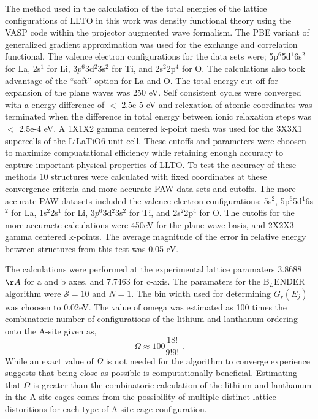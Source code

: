 \documentclass[aps,pre,reprint,superscriptaddress,showkeys]{revtex4-1}
\begin{document}
The method used in the calculation of the total energies of the lattice configurations of LLTO in this work was density functional theory using the VASP code\cite{Vasp1,Vasp2,Vasp3,Vasp4} within the projector augmented wave formalism\cite{Blochl}. The PBE variant of generalized gradient approximation was used for the exchange and correlation functional\cite{PBE}. The valence electron configurations for the data sets were; 5p$^{6}$5d$^{1}$6s$^{2}$ for La, 2s$^{1}$ for Li, 3$p^{6}$3d$^{2}$3s$^{2}$ for Ti, and 2s$^{2}$2p$^{4}$ for O. The calculations also took advantage of the ``soft'' option for La and O.   The total energy cut off for expansion of the plane waves was 250 eV.  Self consistent cycles were converged with a energy difference of $<$ 2.5e-5 eV and relexation  of atomic coordinates was terminated when the difference in total energy between ionic relaxation steps was $<$ 2.5e-4 eV. A 1X1X2 gamma centered k-point mesh was used for the 3X3X1 supercells of the LiLaTiO6 unit cell. These cutoffs and parameters were choosen to maximize compuatational efficiency while retaining enough accuracy to capture important physical properties of LLTO. To test the accuracy of these methods 10 structures were calculated with fixed coordinates at these convergence criteria and more accurate PAW data sets and cutoffs. The more accurate PAW datasets included the valence electron configurations; 5s$^{2}$, 5p$^{6}$5d$^{1}$6s$^{2}$ for La, 1s$^2$2s$^{1}$ for Li, 3$p^{6}$3d$^{2}$3s$^{2}$ for Ti, and 2s$^{2}$2p$^{4}$ for O.  The cutoffs for the more accuracte calculations were 450eV for the plane wave basis, and 2X2X3 gamma centered k-points. The average magnitude of the error in relative energy between structures from this test was 0.05 eV.

  The calculations were performed at the experimental lattice paramaters 3.8688$\AA$ for a and b axes, and 7.7463 for c-axis. The paramaters for the B$_L$ENDER algorithm were $\mathcal{S}=10$ and $N=1$. The bin width used for determining $G_r(E_j)$ was choosen to 0.02eV. The value of omega was estimated as 100 times the combinatoric number of configurations of the lithium and lanthanum ordering onto the A-site  given as, 
\begin{equation}
\Omega \approx 100\frac{18!}{9!9!} \;.
\end{equation}
While an exact value of $\Omega$ is not needed for the algorithm to converge experience suggests that being close as possible is computationally beneficial. Estimating that $\Omega$ is greater than the combinatoric calculation of the lithium and lanthanum in the A-site cages comes from the possibility of multiple distinct lattice distoritions for each type of A-site cage configuration. 
\end{document}
